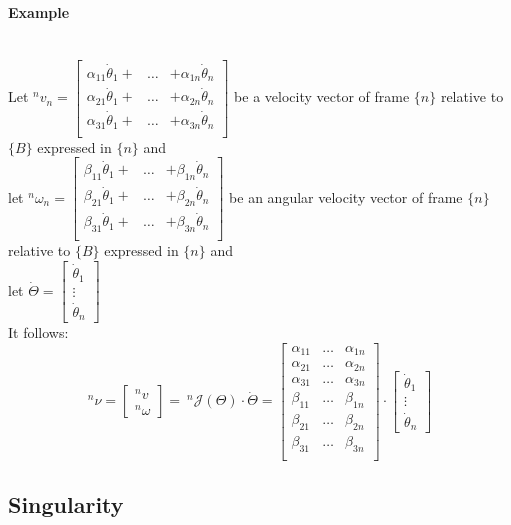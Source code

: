\documentclass[10pt,a4paper]{article}
\newcommand{\vect}[1]{\ensuremath{\begin{bmatrix}#1\end{bmatrix}}}
\begin{document}
\paragraph{Example} ~\\
Let $^nv_n = \begin{bmatrix}
	\alpha_{11} \dot{\theta}_1 + & \dots & + \alpha_{1n} \dot{\theta}_n \\
	\alpha_{21} \dot{\theta}_1 + & \dots & + \alpha_{2n} \dot{\theta}_n \\
	\alpha_{31} \dot{\theta}_1 + & \dots & + \alpha_{3n} \dot{\theta}_n \\	
\end{bmatrix}$ be a velocity vector of frame $\{n\}$ relative to $\{B\}$ expressed in $\{n\}$ and \\
let $^n\omega_n = \begin{bmatrix}
\beta_{11} \dot{\theta}_1 + & \dots & + \beta_{1n} \dot{\theta}_n \\
\beta_{21} \dot{\theta}_1 + & \dots & + \beta_{2n} \dot{\theta}_n \\
\beta_{31} \dot{\theta}_1 + & \dots & + \beta_{3n} \dot{\theta}_n \\	
\end{bmatrix}$ be an angular velocity vector of frame $\{n\}$ relative to $\{B\}$ expressed in $\{n\}$ and \\
let $\dot{\Theta} = \vect{\dot \theta_1 \\ \vdots \\ \dot \theta_n}$ \\
It follows: \\
$$
	^n\nu = \vect{^nv \\ ^n\omega} = ~^n\mathcal{J}(\Theta) ⋅ \dot{\Theta} = \begin{bmatrix}
		\alpha_{11} & \dots & \alpha_{1n} \\
		\alpha_{21} & \dots & \alpha_{2n} \\
		\alpha_{31} & \dots & \alpha_{3n} \\
		\beta_{11} & \dots & \beta_{1n} \\
		\beta_{21} & \dots & \beta_{2n} \\
		\beta_{31} & \dots & \beta_{3n} \\
	\end{bmatrix} ⋅ \vect{\dot{\theta}_1 \\ \vdots \\ \dot{\theta}_n}
$$

\subsection{Singularity}
\end{document}
